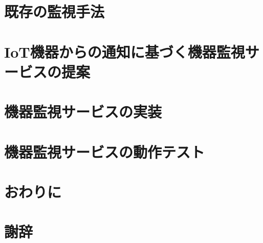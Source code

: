 \documentclass[a4paper]{jreport}
\begin{document}
\chapter{既存の監視手法}

\chapter{IoT機器からの通知に基づく機器監視サービスの提案}

\chapter{機器監視サービスの実装}

\chapter{機器監視サービスの動作テスト}


\chapter{おわりに}


\chapter{謝辞}




\begin{comment}
流れ
序論
・IoTが流行している．
  ->何故？
	・コンピューターの高性能化と価格の低下 -> ほんとに？
	・家庭へのインターネットの普及 -> ほんとに？
  -> ほんとに？

・IoTのデバイス監視で困っている．
  -> デバイスの監視が本当に必要なのか？
	・サービスを止めないために必要 -> ほんとに？
  -> 何故デバイスの監視で困っているのか？
	・見に行くわけに行かない．
	  ->何故？
		・設置場所が離れていることがある．-> ほんとに？
		・数が多くて見きれない． -> ほんとに？
	・サービスに組み込むのにも手間がかかる -> ほんとに？
  -> ほんとに？

提案
・IoT機器向けの機器監視サービスを作ったら，楽になるのでは？
  -> 他の解決策はどうなの？何がダメなの？
	・Ping
	・SNMP
	・Influxdb...
	・Elasticksearch...
  -> 他のがダメなのに，コレが何故OKなの？
	・IoTサービスの開発に特化しているため
	  ->どう特化してるの？
		・グラフ作成等の手間が不要
		・一覧して見ることができる
		・機器から通知が送られてくるので，NAPTで突っかからない．
  -> ほんとに？=>検証へ

検証
・田頭さんの研究で使ってもらい評価を得る．
　1. 使い方について簡単に説明
　2. 使っている様子を観測
  3. 最後に聞き取りを実施
-> なんだって？
　・こんな意見が聞けた．
　・サービスについては，〇〇だと言われた．
　・観察している中で，こんな所が気になった．

結論
・確かに楽になった or 楽にならなかった．
 -> 何故？

今後の課題としてこんなことがあった．
 ・
\end{comment}
\end{document}
